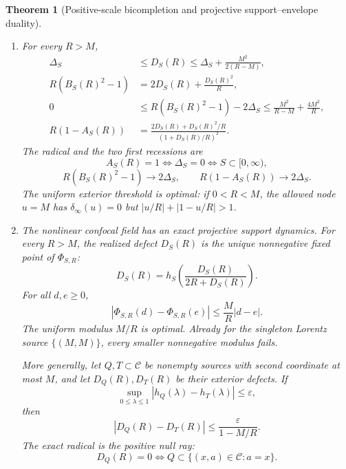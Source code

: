 \documentclass[11pt]{article}
\newtheorem{theorem}{Theorem}[section]
\theoremstyle{remark}
\begin{document}
\begin{theorem}[Positive-scale bicompletion and projective support--envelope duality]
\begin{enumerate}
\item For every $R>M$,
\begin{align}
 \Delta_S&\le D_S(R)\le
 \Delta_S+\frac{M^2}{2(R-M)},\tag{2.14}\\
 R(B_S(R)^2-1)&=2D_S(R)+\frac{D_S(R)^2}{R},\tag{2.15}\\
 0&\le R(B_S(R)^2-1)-2\Delta_S
 \le\frac{M^2}{R-M}+\frac{4M^2}{R},\tag{2.16}\\
 R(1-A_S(R))&=
 \frac{2D_S(R)+D_S(R)^2/R}{(1+D_S(R)/R)^2}.\tag{2.17}
\end{align}
The radical and the two first recessions are
\begin{equation}
 A_S(R)=1\Longleftrightarrow\Delta_S=0
 \Longleftrightarrow S\subset[0,\infty),
 \tag{2.18}
\end{equation}
\begin{equation}
 R(B_S(R)^2-1)\longrightarrow2\Delta_S,
 \qquad R(1-A_S(R))\longrightarrow2\Delta_S.
 \tag{2.19}
\end{equation}
The uniform exterior threshold is optimal: if $0<R<M$, the allowed node $u=M$ has
$\delta_\infty(u)=0$ but $|u/R|+|1-u/R|>1$.

\item The nonlinear confocal field has an exact projective support dynamics.  For every $R>M$,
the realized defect $D_S(R)$ is the unique nonnegative fixed point of $\Phi_{S,R}$:
\begin{equation}
 D_S(R)=h_S\!\left(\frac{D_S(R)}{2R+D_S(R)}\right).
 \tag{2.19a}
\end{equation}
For all $d,e\ge0$,
\begin{equation}
 |\Phi_{S,R}(d)-\Phi_{S,R}(e)|
 \le\frac MR|d-e|.
 \tag{2.19b}
\end{equation}
The uniform modulus $M/R$ is optimal.  Already for the singleton Lorentz source
$\{(M,M)\}$, every smaller nonnegative modulus fails.

More generally, let $Q,T\subset\mathcal C$ be nonempty sources with second coordinate at most
$M$, and let $D_Q(R),D_T(R)$ be their exterior defects.  If
\[
 \sup_{0\le\lambda\le1}|h_Q(\lambda)-h_T(\lambda)|\le\varepsilon,
\]
then
\begin{equation}
 |D_Q(R)-D_T(R)|\le\frac{\varepsilon}{1-M/R}.
 \tag{2.19c}
\end{equation}
The exact radical is the positive null ray:
\begin{equation}
 D_Q(R)=0
 \Longleftrightarrow
 Q\subset\{(x,a)\in\mathcal C:a=x\}.
 \tag{2.19d}
\end{equation}


\end{enumerate}
\end{theorem}
\end{document}
